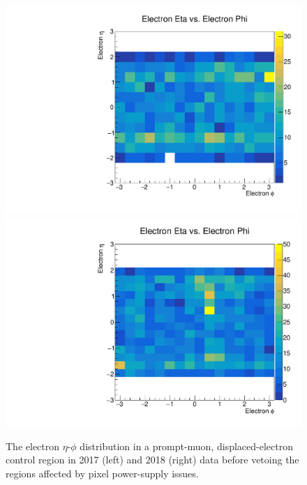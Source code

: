 \begin{figure}
\centering
\includegraphics[scale=0.3]{figures/selection/displacedE_etaPhi_data_2017.pdf}
\includegraphics[scale=0.3]{figures/selection/displacedE_etaPhi_data_2018.pdf}
\caption{The electron $\eta$-$\phi$ distribution in a prompt-muon, displaced-electron control region in 2017 (left) and 2018 (right) data before vetoing the regions affected by pixel power-supply issues.}
\label{eta_phi_vetos}
\end{figure}